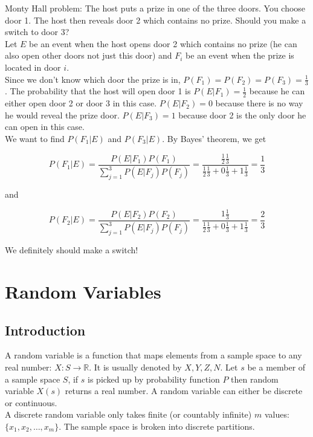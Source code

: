\documentclass[12pt, a4paper]{article}
\newcounter{exa}
\begin{document}
\begin{texample}
Monty Hall problem: The host puts a prize in one of the three doors. You choose door 1. The host then reveals door 2 which contains no prize. Should you make a switch to door 3? \\

Let $E$ be an event when the host opens door 2 which contains no prize (he can also open other doors not just this door) and $F_i$ be an event when the prize is located in door $i$. \\

Since we don't know which door the prize is in, $P(F_1)=P(F_2)=P(F_3)=\frac13$. The probability that the host will open door 1 is $P(E|F_1)=\frac12$ because he can either open door 2 or door 3 in this case. $P(E|F_2)=0$ because there is no way he would reveal the prize door. $P(E|F_3)=1$ because door 2 is the only door he can open in this case. \\

We want to find $P(F_1|E)$ and $P(F_3|E)$. By Bayes' theorem, we get

$$P(F_1|E)=\frac{P(E|F_1)P(F_1)}{\sum_{j=1}^3 P(E|F_j)P(F_j)}=\frac{\frac12\frac13}{\frac12\frac13+0\frac13+1\frac13}=\frac13$$

and

$$P(F_2|E)=\frac{P(E|F_2)P(F_2)}{\sum_{j=1}^3 P(E|F_j)P(F_j)}=\frac{1\frac13}{\frac12\frac13+0\frac13+1\frac13}=\frac23$$

We definitely should make a switch!
\end{texample}

\section{Random Variables}

\subsection{Introduction}

A random variable is a function that maps elements from a sample space to any real number: $X : S\to\mathbb{R}$. It is usually denoted by $X, Y, Z, N$. Let $s$ be a member of a sample space $S$, if $s$ is picked up by probability function $P$ then random variable $X(s)$ returns a real number. A random variable can either be discrete or continuous. \\

A discrete random variable only takes finite (or countably infinite) $m$ values: $\{x_1, x_2, \dots, x_m\}$. The sample space is broken into discrete partitions.
\end{document}

